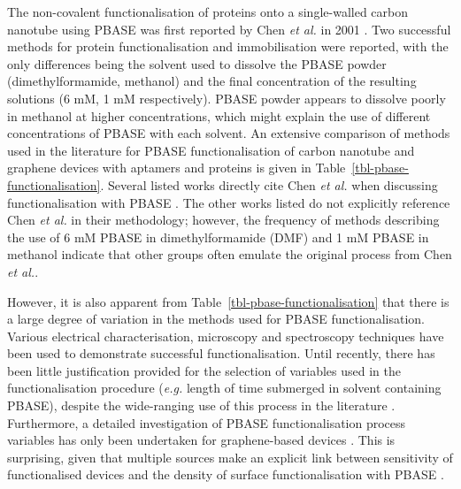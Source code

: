 \documentclass[
  a4paper,
]{scrbook}
\begin{document}
The non-covalent functionalisation of proteins onto a single-walled
carbon nanotube using PBASE was first reported by Chen \emph{et al.} in
2001 \autocite{Chen2001}. Two successful methods for protein
functionalisation and immobilisation were reported, with the only
differences being the solvent used to dissolve the PBASE powder
(dimethylformamide, methanol) and the final concentration of the
resulting solutions (6 mM, 1 mM respectively). PBASE powder appears to
dissolve poorly in methanol at higher concentrations, which might
explain the use of different concentrations of PBASE with each solvent.
An extensive comparison of methods used in the literature for PBASE
functionalisation of carbon nanotube and graphene devices with aptamers
and proteins is given in Table~\ref{tbl-pbase-functionalisation}.
Several listed works directly cite Chen \emph{et al.} when discussing
functionalisation with PBASE
\autocite{Besteman2003,Cella2010,Campos2019,Zheng2016,Ohno2010}. The
other works listed do not explicitly reference Chen \emph{et al.} in
their methodology; however, the frequency of methods describing the use
of 6 mM PBASE in dimethylformamide (DMF) and 1 mM PBASE in methanol
indicate that other groups often emulate the original process from Chen
\emph{et al.}.

However, it is also apparent from
Table~\ref{tbl-pbase-functionalisation} that there is a large degree of
variation in the methods used for PBASE functionalisation. Various
electrical characterisation, microscopy and spectroscopy techniques have
been used to demonstrate successful functionalisation. Until recently,
there has been little justification provided for the selection of
variables used in the functionalisation procedure (\emph{e.g.} length of
time submerged in solvent containing PBASE), despite the wide-ranging
use of this process in the literature
\autocite{Hinnemo2017,Zhen2018,Wang2020}. Furthermore, a detailed
investigation of PBASE functionalisation process variables has only been
undertaken for graphene-based devices
\autocite{Zhen2018,Hao2020,Wang2020,Mishyn2022}. This is surprising,
given that multiple sources make an explicit link between sensitivity of
functionalised devices and the density of surface functionalisation with
PBASE \autocite{White2008,Hermanson2013-3,Chen2014}.
\end{document}
